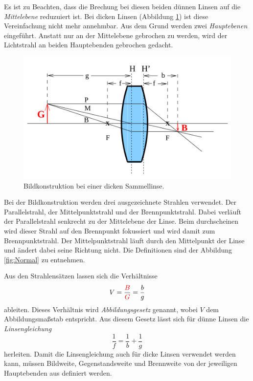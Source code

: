 Es ist zu Beachten, dass die Brechung bei diesen beiden dünnen Linsen auf die \textit{Mittelebene} reduzuiert ist. Bei dicken Linsen (Abbildung \ref{fig:Dick}) ist diese Vereinfachung nicht mehr annehmbar. Aus dem Grund werden zwei \textit{Hauptebenen} eingeführt. Anstatt nur an der Mittelebene gebrochen zu werden, wird der Lichtstrahl an beiden Hauptebenden gebrochen gedacht.

\begin{figure}
    \includegraphics[width=\textwidth]{data/Breite_Linse.png}
    \caption{Bildkonstruktion bei einer dicken Sammellinse.}
    \label{fig:Dick}
\end{figure}

Bei der Bildkonstruktion werden drei ausgezeichnete Strahlen verwendet. Der Parallelstrahl, der Mittelpunktstrahl und der Brennpunktstrahl. Dabei verläuft der Parallelstrahl senkrecht zu der Mittelebene der Linse. Beim durchscheinen wird dieser Strahl auf den Brennpunkt fokussiert und wird damit zum Brennpunktstrahl. Der Mittelpunktstrahl läuft durch den Mittelpunkt der Linse und ändert dabei seine Richtung nicht. Die Definitionen sind der Abbildung \ref{fig:Normal} zu entnehmen. 

Aus den Strahlensätzen lassen sich die Verhältnisse 
\begin{equation}
    V=\frac{\textcolor{red}{B}}{\textcolor{red}{G}} = \frac{b}{g}
\end{equation}
ableiten. Dieses Verhältnis wird \textit{Abbildungsgesetz} genannt, wobei $V$ dem Abbildungsmaßstab entspricht. 
Aus diesem Gesetz lässt sich für dünne Linsen die \textit{Linsengleichung}
\begin{equation}
    \frac{1}{f}=\frac{1}{b}+\frac{1}{g}
    \label{eqn:linsengl}
\end{equation}
herleiten.
Damit die Linsengleichung auch für dicke Linsen verwendet werden kann, müssen Bildweite, Gegenstandsweite und Brennweite von der jeweiligen Hauptebenden aus definiert werden.


